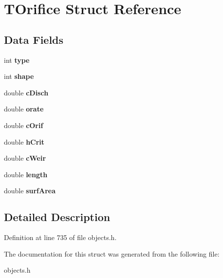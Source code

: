 \hypertarget{struct_t_orifice}{}\section{T\+Orifice Struct Reference}
\label{struct_t_orifice}
\subsection*{Data Fields}
\begin{DoxyCompactItemize}
\item 
\mbox{\label{struct_t_orifice_ac765329451135abec74c45e1897abf26}} 
int {\bfseries type}
\item 
\mbox{\label{struct_t_orifice_ab1a7e6f9587f8a51986ea12e6c121fa3}} 
int {\bfseries shape}
\item 
\mbox{\label{struct_t_orifice_af18db03ef1ab63a5c1805a243d60cff9}} 
double {\bfseries c\+Disch}
\item 
\mbox{\label{struct_t_orifice_ad52de3e020ce8066c66783e394828046}} 
double {\bfseries orate}
\item 
\mbox{\label{struct_t_orifice_a0a226cd98b453501b78277a5886e2a82}} 
double {\bfseries c\+Orif}
\item 
\mbox{\label{struct_t_orifice_a96ccb4c4fbf1bea3a41dfde04cf017ae}} 
double {\bfseries h\+Crit}
\item 
\mbox{\label{struct_t_orifice_a315b35861916f9b9640b2c6e63a8b47b}} 
double {\bfseries c\+Weir}
\item 
\mbox{\label{struct_t_orifice_a928b11f5716331f0b89abe7d8d4124b4}} 
double {\bfseries length}
\item 
\mbox{\label{struct_t_orifice_a18f092e38579e12ec942159bf200580c}} 
double {\bfseries surf\+Area}
\end{DoxyCompactItemize}


\subsection{Detailed Description}


Definition at line 735 of file objects.\+h.



The documentation for this struct was generated from the following file\+:\begin{DoxyCompactItemize}
\item 
objects.\+h\end{DoxyCompactItemize}
